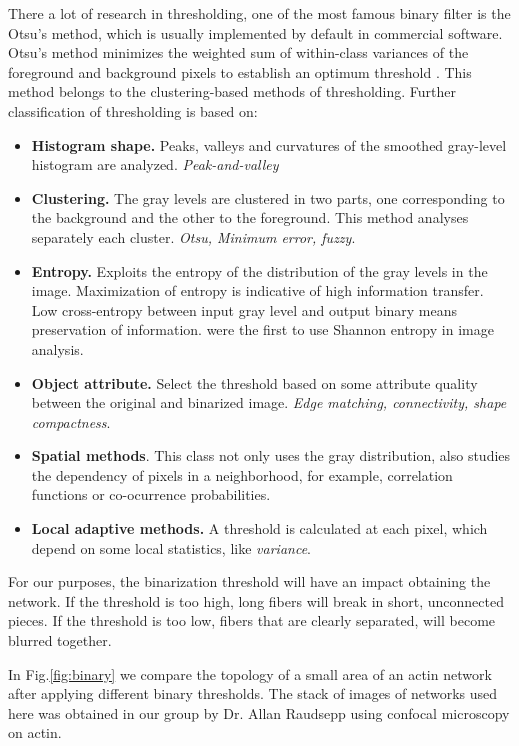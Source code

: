 There a lot of research in thresholding, one of the most famous binary filter is
the Otsu's method, which is usually implemented by default in commercial software.
Otsu's method minimizes the weighted sum of within-class variances of the
foreground and background pixels to establish an optimum threshold
\citep{sezgin_survey_2004}. This method belongs to the clustering-based methods
of thresholding. Further classification of thresholding is based on:
\begin{itemize}
  \item \textbf{Histogram shape.} Peaks, valleys and curvatures of the smoothed
  gray-level histogram are analyzed. \emph{Peak-and-valley}
  \item \textbf{Clustering.} The gray levels are clustered in two parts, one
  corresponding to the background and the other to the foreground. This method
  analyses separately each cluster. \emph{Otsu, Minimum error, fuzzy}.
  \item \textbf{Entropy.} Exploits the entropy of the distribution of the gray
  levels in the image. Maximization of entropy is indicative of high information transfer.
  Low cross-entropy between input gray level and output binary means
  preservation of information. \citet{pal_automatic_1983}
  were the first to use Shannon entropy in image analysis.
 \citep{pal_image_1988}
  \item \textbf{Object attribute.} Select the threshold based on some attribute
  quality between the original and binarized image. \emph{Edge matching, connectivity,
  shape compactness}.
  \item \textbf{Spatial methods}. This class not only uses the gray
  distribution, also studies the dependency of pixels in a neighborhood, for example, correlation
functions or co-ocurrence probabilities.
  \item \textbf{Local adaptive methods.} A threshold is calculated at each
  pixel, which depend on some local statistics, like \emph{variance}.
\end{itemize}



For our purposes, the binarization threshold will have an impact obtaining the
network. If the threshold is too high, long fibers will break in short,
unconnected pieces. If the threshold is too low, fibers that are clearly
separated, will become blurred together.

In Fig.\ref{fig:binary}
we compare the topology of a small area of an actin network after
applying different binary thresholds. The stack of images of
networks used here was obtained in our group by Dr. Allan
Raudsepp using confocal microscopy on actin.
 


